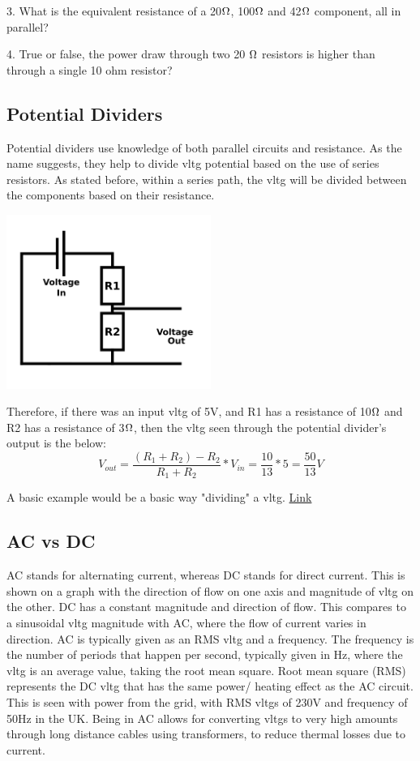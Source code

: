 \documentclass[a4paper,11pt]{report}
\newcommand{\Examples}[1] %
{
\par\noindent %
\phantomsection %
\todo[inline, color=red!30]{\textbf{#1}} %
\vspace{1em} %
}
\begin{document}
3. What is the equivalent resistance of a 20$\ohm$, 100$\ohm$ and 42$\ohm$ component, all in parallel?

4. True or false, the power draw through two  20 $\ohm$ resistors is higher than through a single 10 ohm resistor?

\subsection{Potential Dividers}

Potential dividers use knowledge of both parallel circuits and resistance. As the name suggests, they help to divide \gls{vltg} potential based on the use of series resistors. As stated before, within a series path, the \gls{vltg} will be divided between the components based on their resistance.

\includegraphics[width=0.5\textwidth]{PotentialDivider}

Therefore, if there was an input \gls{vltg} of 5V, and R1 has a resistance of 10$\ohm$ and R2 has a resistance of 3$\ohm$, then the \gls{vltg} seen through the potential divider's output is the below:
\[V_{out}=\frac{(R_1+R_2)-R_2}{R_1+R_2}*V_{in} = \frac{10}{13}*5 = \frac{50}{13}V\]

\Examples{Example circuits etc}

A basic example would be a basic way "dividing" a \gls{vltg}. \href{https://tinyurl.com/27sybjry}{Link}

\subsection{AC vs DC}

AC stands for alternating current, whereas DC stands for direct current. This is shown on a graph with the direction of flow on one axis and magnitude of \gls{vltg} on the other. DC has a constant magnitude and direction of flow. This compares to a sinusoidal \gls{vltg} magnitude with AC, where the flow of current varies in direction. AC is typically given as an RMS \gls{vltg} and a frequency. The frequency is the number of periods that happen per second, typically given in Hz, where the \gls{vltg} is an average value, taking the root mean square. Root mean square (RMS) represents the DC \gls{vltg} that has the same power/ heating effect as the AC circuit. This is seen with power from the grid, with RMS \gls{vltg}s of 230V and frequency of 50Hz in the UK.
Being in AC allows for converting \gls{vltg}s to very high amounts through long distance cables using transformers, to reduce thermal losses due to current.
\end{document}
